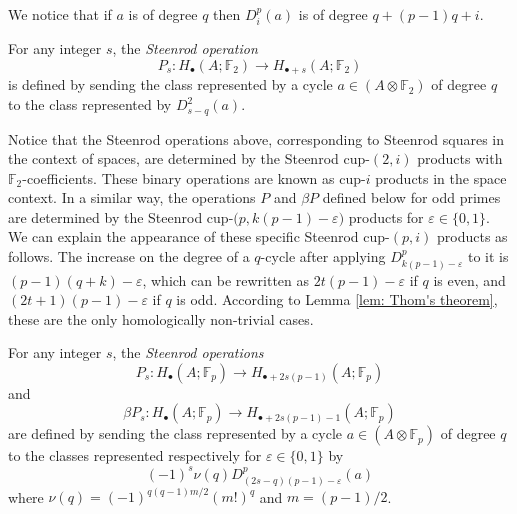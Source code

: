 We notice that if $a$ is of degree $q$ then $D^p_i(a)$ is of degree $q + (p-1)q + i$.

\begin{definition}
	For any integer $s$, the \textit{Steenrod operation}
	\begin{equation*}
	P_s \colon H_\bullet(A; \mathbb{F}_2) \to H_{\bullet + s}(A; \mathbb{F}_2)
	\end{equation*}
	is defined by sending the class represented by a cycle $a \in (A \otimes \mathbb{F}_2)$ of degree $q$ to the class represented by $D^2_{s-q}(a)$.
\end{definition}

Notice that the Steenrod operations above, corresponding to Steenrod squares in the context of spaces, are determined by the Steenrod cup-$(2,i)$ products with $\mathbb{F}_2$-coefficients.
These binary operations are known as cup-$i$ products \cite{steenrod1947products, medina2021newformulas} in the space context.
In a similar way, the operations $P$ and $\beta P$ defined below for odd primes are determined by the Steenrod cup-$\big(p, k(p-1)-\varepsilon\big)$ products for $\varepsilon \in \{0,1\}$.
We can explain the appearance of these specific Steenrod cup-$(p,i)$ products as follows.
The increase on the degree of a $q$-cycle after applying $D^p_{k(p-1)-\varepsilon}$ to it is $(p-1)(q+k) - \varepsilon$, which can be rewritten as $2t(p-1) - \varepsilon$ if $q$ is even, and $(2t+1)(p-1) - \varepsilon$ if $q$ is odd.
According to Lemma \ref{lem: Thom's theorem}, these are the only homologically non-trivial cases.

\begin{definition} \label{def: Steenrod operations at odd prime}
	For any integer $s$, the \textit{Steenrod operations}
	\begin{equation*}
	P_s \colon H_\bullet(A; \mathbb{F}_p) \to H_{\bullet + 2s(p-1)}(A; \mathbb{F}_p)
	\end{equation*}
	and
	\begin{equation*}
	\beta P_s \colon H_\bullet(A; \mathbb{F}_p) \to H_{\bullet + 2s(p-1) - 1}(A; \mathbb{F}_p)
	\end{equation*}
	are defined by sending the class represented by a cycle $a \in (A \otimes \mathbb{F}_p)$ of degree $q$ to the classes represented respectively for $\varepsilon \in\{0,1\}$ by
	\begin{equation*}
	(-1)^s \nu(q) D^p_{(2s-q)(p-1)-\varepsilon}(a)
	\end{equation*}
	where $\nu(q) = (-1)^{q(q-1)m/2}(m!)^q$ and $m = (p-1)/2$.
\end{definition}

